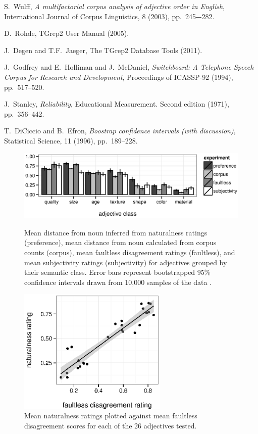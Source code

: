 \documentclass{pnastwo}
\begin{document}
\begin{article}
\begin{thebibliography}{10}
		
	S.~Wulff, {\em A multifactorial corpus analysis of adjective order in English}, International Journal of Corpus Linguistics, 8 (2003), pp.~245‒-282.
	
	D.~Rohde, TGrep2 User Manual (2005).
	
	J.~Degen and T.F.~Jaeger, The TGrep2 Database Tools (2011).
	
	J.~Godfrey and E.~Holliman and J.~McDaniel, {\em Switchboard: A Telephone Speech Corpus for Research and Development}, Proceedings of ICASSP-92 (1994),
	pp.~517--520.
	
	J.~Stanley, {\em Reliability}, Educational Measurement. Second edition (1971), pp.~356--442.	
	
	T.~DiCiccio and B.~Efron, {\em Boostrap confidence intervals (with discussion)}, Statistical Science, 11 (1996), pp.~189--228.
	
\end{thebibliography}


\end{article}

\begin{figure}
	\centering
	{\includegraphics[width=.75\linewidth]{plots/expt_results-new.eps}}\par
	\caption{Mean distance from noun inferred from naturalness ratings (preference), mean distance from noun calculated from corpus counts (corpus),  mean faultless disagreement ratings (faultless), and mean subjectivity ratings (subjectivity) for adjectives grouped by their semantic class. Error bars represent bootstrapped 95\% confidence intervals drawn from 10,000 samples of the data \cite{diciccioefron1996}.}\label{results}
\end{figure}

\begin{figure}
	\centering\includegraphics[width=2.8in]{plots/naturalness-faultless-new.eps}
	\caption{Mean naturalness ratings plotted against mean faultless disagreement scores for each of the 26 adjectives tested.}\label{naturalness-faultless-pred}
\end{figure}
\end{document}
